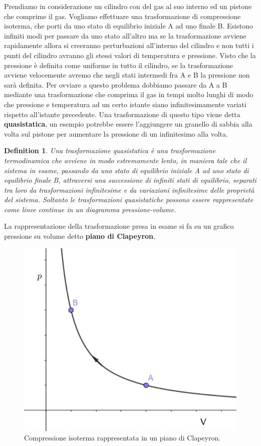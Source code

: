 \documentclass[10pt,a4paper]{article}
\newtheorem{definition}{Definition}
\begin{document}
Prendiamo in considerazione un cilindro con del gas al suo interno ed un pistone che comprime il gas. Vogliamo effettuare una trasformazione di compressione isoterma, che porti da uno stato di equilibrio iniziale A ad uno finale B. Esistono infiniti modi per passare da uno stato all'altro ma se la trasformazione avviene rapidamente allora si creeranno perturbazioni all'interno del cilindro e non tutti i punti del cilindro avranno gli stessi valori di temperatura e pressione. Visto che la pressione è definita come uniforme in tutto il cilindro, se la trasformazione avviene velocemente avremo che negli stati intermedi fra A e B la pressione non sarà definita. Per ovviare a questo problema dobbiamo passare da A a B mediante una trasformazione che comprima il gas in tempi molto lunghi di modo che pressione e temperatura ad un certo istante siano infinitesimamente variati rispetto all'istante precedente. Una trasformazione di questo tipo viene detta \textbf{quasistatica}, un esempio potrebbe essere l'aggiungere un granello di sabbia alla volta sul pistone per aumentare la pressione di un infinitesimo alla volta. 
\begin{definition}
	Una trasformazione quasistatica è una trasformazione termodinamica che avviene in modo estremamente lento, in maniera tale che il sistema in esame, passando da uno stato di equilibrio iniziale A ad uno stato di equilibrio finale B, attraversi una successione di infiniti stati di equilibrio, separati tra loro da trasformazioni infinitesime e da variazioni infinitesime delle proprietà del sistema. Soltanto le trasformazioni quasistatiche possono essere rappresentate come linee continue in un diagramma pressione-volume.
\end{definition} 
La rappresentazione della trasformazione presa in esame si fa su un grafico pressione su volume detto \textbf{piano di Clapeyron}.
\begin{figure}[h!]
	\centering
	\includegraphics[width=0.5\linewidth]{../images/isoterma}
	\caption{Compressione isoterma rappresentata in un piano di Clapeyron.}
	\label{fig:isoterma}
\end{figure}
\end{document}
